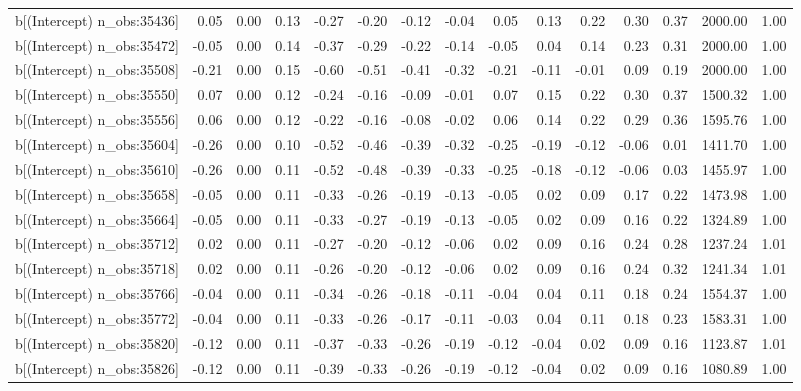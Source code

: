 \begin{table}[ht]
\begin{tabular}{rrrrrrrrrrrrrrr}
  b[(Intercept) n\_obs:35436] & 0.05 & 0.00 & 0.13 & -0.27 & -0.20 & -0.12 & -0.04 & 0.05 & 0.13 & 0.22 & 0.30 & 0.37 & 2000.00 & 1.00 \\ 
  b[(Intercept) n\_obs:35472] & -0.05 & 0.00 & 0.14 & -0.37 & -0.29 & -0.22 & -0.14 & -0.05 & 0.04 & 0.14 & 0.23 & 0.31 & 2000.00 & 1.00 \\ 
  b[(Intercept) n\_obs:35508] & -0.21 & 0.00 & 0.15 & -0.60 & -0.51 & -0.41 & -0.32 & -0.21 & -0.11 & -0.01 & 0.09 & 0.19 & 2000.00 & 1.00 \\ 
  b[(Intercept) n\_obs:35550] & 0.07 & 0.00 & 0.12 & -0.24 & -0.16 & -0.09 & -0.01 & 0.07 & 0.15 & 0.22 & 0.30 & 0.37 & 1500.32 & 1.00 \\ 
  b[(Intercept) n\_obs:35556] & 0.06 & 0.00 & 0.12 & -0.22 & -0.16 & -0.08 & -0.02 & 0.06 & 0.14 & 0.22 & 0.29 & 0.36 & 1595.76 & 1.00 \\ 
  b[(Intercept) n\_obs:35604] & -0.26 & 0.00 & 0.10 & -0.52 & -0.46 & -0.39 & -0.32 & -0.25 & -0.19 & -0.12 & -0.06 & 0.01 & 1411.70 & 1.00 \\ 
  b[(Intercept) n\_obs:35610] & -0.26 & 0.00 & 0.11 & -0.52 & -0.48 & -0.39 & -0.33 & -0.25 & -0.18 & -0.12 & -0.06 & 0.03 & 1455.97 & 1.00 \\ 
  b[(Intercept) n\_obs:35658] & -0.05 & 0.00 & 0.11 & -0.33 & -0.26 & -0.19 & -0.13 & -0.05 & 0.02 & 0.09 & 0.17 & 0.22 & 1473.98 & 1.00 \\ 
  b[(Intercept) n\_obs:35664] & -0.05 & 0.00 & 0.11 & -0.33 & -0.27 & -0.19 & -0.13 & -0.05 & 0.02 & 0.09 & 0.16 & 0.22 & 1324.89 & 1.00 \\ 
  b[(Intercept) n\_obs:35712] & 0.02 & 0.00 & 0.11 & -0.27 & -0.20 & -0.12 & -0.06 & 0.02 & 0.09 & 0.16 & 0.24 & 0.28 & 1237.24 & 1.01 \\ 
  b[(Intercept) n\_obs:35718] & 0.02 & 0.00 & 0.11 & -0.26 & -0.20 & -0.12 & -0.06 & 0.02 & 0.09 & 0.16 & 0.24 & 0.32 & 1241.34 & 1.01 \\ 
  b[(Intercept) n\_obs:35766] & -0.04 & 0.00 & 0.11 & -0.34 & -0.26 & -0.18 & -0.11 & -0.04 & 0.04 & 0.11 & 0.18 & 0.24 & 1554.37 & 1.00 \\ 
  b[(Intercept) n\_obs:35772] & -0.04 & 0.00 & 0.11 & -0.33 & -0.26 & -0.17 & -0.11 & -0.03 & 0.04 & 0.11 & 0.18 & 0.23 & 1583.31 & 1.00 \\ 
  b[(Intercept) n\_obs:35820] & -0.12 & 0.00 & 0.11 & -0.37 & -0.33 & -0.26 & -0.19 & -0.12 & -0.04 & 0.02 & 0.09 & 0.16 & 1123.87 & 1.01 \\ 
  b[(Intercept) n\_obs:35826] & -0.12 & 0.00 & 0.11 & -0.39 & -0.33 & -0.26 & -0.19 & -0.12 & -0.04 & 0.02 & 0.09 & 0.16 & 1080.89 & 1.00 \\ 

\end{tabular}
\end{table}
